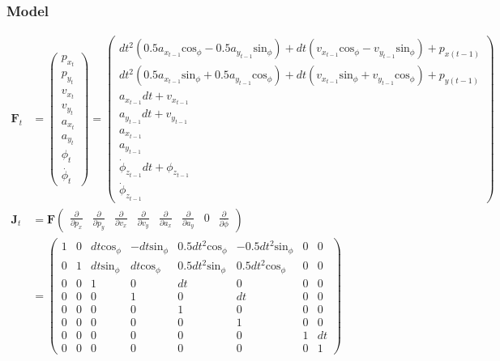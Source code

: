 \documentclass{article}
\begin{document}
\subsubsection{Model}

\begin{align}
 \textbf{F}_{t} &=
 \left(\begin{matrix}
  p_{x_t} \\
  p_{y_t} \\
  v_{x_t} \\
  v_{y_t} \\
  a_{x_t} \\
  a_{y_t} \\
  \phi_t \\
  \dot{\phi_t}
 \end{matrix}\right)
 = \left(\begin{matrix}dt^{2} \left(0.5 a_{x_{t-1}} \textrm{cos}_\phi - 0.5 a_{y_{t-1}} \textrm{sin}_\phi\right) + dt \left(v_{x_{t-1}} \textrm{cos}_\phi - v_{y_{t-1}} \textrm{sin}_\phi\right) + p_{x (t-1)}\\dt^{2} \left(0.5 a_{x_{t-1}} \textrm{sin}_\phi + 0.5 a_{y_{t-1}} \textrm{cos}_\phi\right) + dt \left(v_{x_{t-1}} \textrm{sin}_\phi + v_{y_{t-1}} \textrm{cos}_\phi\right) + p_{y (t-1)}\\a_{x_{t-1}} dt + v_{x_{t-1}}\\a_{y_{t-1}} dt + v_{y_{t-1}}\\a_{x_{t-1}}\\a_{y_{t-1}}\\\dot{\phi}_{z_{t-1}} dt + \phi_{z_{t-1}}\\\dot{\phi}_{z_{t-1}}\end{matrix}\right) \\
  \textbf{J}_t &= 
  \textbf{F}\left(\begin{matrix}
    \frac{\partial}{\partial p_x} & \frac{\partial}{\partial p_y} & \frac{\partial}{\partial v_x} & \frac{\partial}{\partial v_y} & \frac{\partial}{\partial a_x} & \frac{\partial}{\partial a_y} & 0 & \frac{\partial}{\partial \dot{\phi}}
  \end{matrix}\right) \\
  &= \left(\begin{matrix}1 & 0 & dt \textrm{cos}_\phi & - dt \textrm{sin}_\phi & 0.5 dt^{2} \textrm{cos}_\phi & - 0.5 dt^{2} \textrm{sin}_\phi & 0 & 0\\0 & 1 & dt \textrm{sin}_\phi & dt \textrm{cos}_\phi & 0.5 dt^{2} \textrm{sin}_\phi & 0.5 dt^{2} \textrm{cos}_\phi & 0 & 0\\0 & 0 & 1 & 0 & dt & 0 & 0 & 0\\0 & 0 & 0 & 1 & 0 & dt & 0 & 0\\0 & 0 & 0 & 0 & 1 & 0 & 0 & 0\\0 & 0 & 0 & 0 & 0 & 1 & 0 & 0\\0 & 0 & 0 & 0 & 0 & 0 & 1 & dt\\0 & 0 & 0 & 0 & 0 & 0 & 0 & 1\end{matrix}\right)
\end{align}
\end{document}
